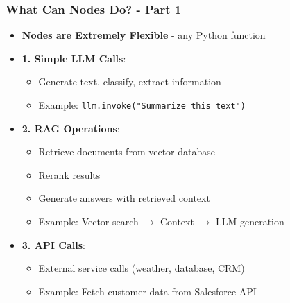 \begin{frame}[fragile]\frametitle{What Can Nodes Do? - Part 1}
      \begin{itemize}
        \item \textbf{Nodes are Extremely Flexible} - any Python function
        \item \textbf{1. Simple LLM Calls}:
        \begin{itemize}
            \item Generate text, classify, extract information
            \item Example: \texttt{llm.invoke("Summarize this text")}
        \end{itemize}
        \item \textbf{2. RAG Operations}:
        \begin{itemize}
            \item Retrieve documents from vector database
            \item Rerank results
            \item Generate answers with retrieved context
            \item Example: Vector search \(\rightarrow\) Context \(\rightarrow\) LLM generation
        \end{itemize}
        \item \textbf{3. API Calls}:
        \begin{itemize}
            \item External service calls (weather, database, CRM)
            \item Example: Fetch customer data from Salesforce API
        \end{itemize}
      \end{itemize}
\end{frame}
